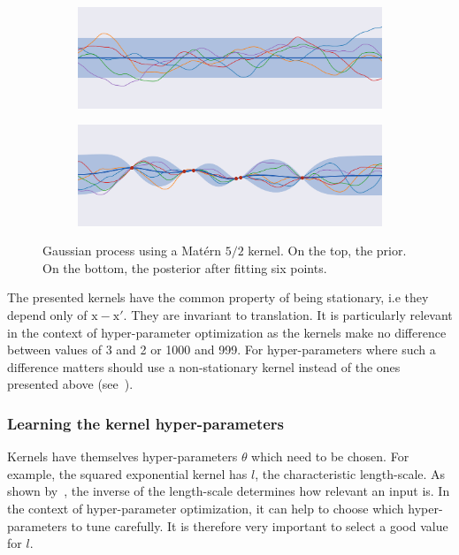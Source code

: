 \begin{figure}[htb]
    \centering
    \begin{subfigure}[b]{\textwidth}
        \includegraphics[width=\textwidth]{img_hyperopt/gp_matern_prior}
    \end{subfigure}

    \begin{subfigure}[b]{\textwidth}
        \includegraphics[width=\textwidth]{img_hyperopt/gp_matern_posterior}
    \end{subfigure}
    \caption[Gaussian process using a Matérn $5/2$ kernel]{Gaussian process using a Matérn $5/2$ kernel. On the top, the prior. On the bottom, the posterior after fitting six points.}
    \label{fig:gp_matern}
\end{figure}

The presented kernels have the common property of being stationary, i.e they depend only of $\mathrm{x} - \mathrm{x'}$. They are invariant to translation. It is particularly relevant in the context of hyper-parameter optimization as the kernels make no difference between values of 3 and 2 or 1000 and 999. For hyper-parameters where such a difference matters should use a non-stationary kernel instead of the ones presented above (see~\textcite{paciorek2003NIPS}).

\subsubsection{Learning the kernel hyper-parameters}

Kernels have themselves hyper-parameters $\theta$ which need to be chosen. For example, the squared exponential kernel has $l$, the characteristic length-scale. As shown by~\textcite{neal1996phd}, the inverse of the length-scale determines how relevant an input is. In the context of hyper-parameter optimization, it can help to choose which hyper-parameters to tune carefully. It is therefore very important to select a good value for $l$. 

